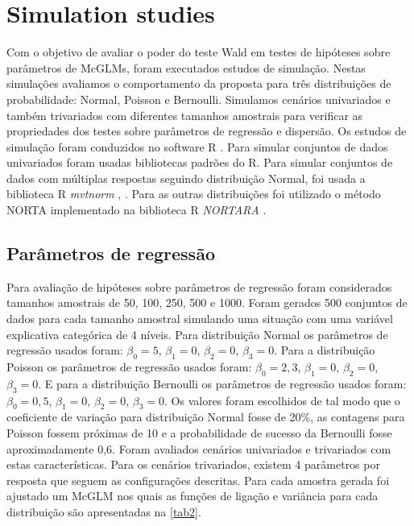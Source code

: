\documentclass[AMA,STIX1COL]{WileyNJD-v2}
\begin{document}

\section{Simulation studies}\label{sec5}

Com o objetivo de avaliar o poder do teste Wald em testes de hipóteses sobre parâmetros de McGLMs, foram executados estudos de simulação. Nestas simulações avaliamos o comportamento da proposta para três distribuições de probabilidade: Normal, Poisson e Bernoulli. Simulamos cenários univariados e também trivariados com diferentes tamanhos amostrais para verificar as propriedades dos testes sobre parâmetros de regressão e dispersão. Os estudos de simulação foram conduzidos no software R \cite{R}. Para simular conjuntos de dados univariados foram usadas bibliotecas padrões do R. Para simular conjuntos de dados com múltiplas respostas seguindo distribuição Normal, foi usada a biblioteca R \emph{mvtnorm} \cite{mvtnorm1}, \cite{mvtnorm2}. Para as outras distribuições foi utilizado o método NORTA \cite{norta} implementado na biblioteca R \emph{NORTARA} \cite{nortara}.

\subsection{Parâmetros de regressão}

Para avaliação de hipóteses sobre parâmetros de regressão foram considerados tamanhos amostrais de 50, 100, 250, 500 e 1000. Foram gerados 500 conjuntos de dados para cada tamanho amostral simulando uma situação com uma variável explicativa categórica de 4 níveis. Para distribuição Normal os parâmetros de regressão usados foram: $\beta_0 = 5$, $\beta_1 = 0$, $\beta_2 = 0$, $\beta_3 = 0$. Para a distribuição Poisson os parâmetros de regressão usados foram: $\beta_0 = 2,3$, $\beta_1 = 0$, $\beta_2 = 0$, $\beta_3 = 0$. E para a distribuição Bernoulli os parâmetros de regressão usados foram: $\beta_0 = 0,5$, $\beta_1 = 0$, $\beta_2 = 0$, $\beta_3 = 0$. Os valores foram escolhidos de tal modo que o coeficiente de variação para distribuição Normal fosse de 20\%, as contagens para Poisson fossem próximas de 10 e a probabilidade de sucesso da Bernoulli fosse aproximadamente 0,6. Foram avaliados cenários univariados e trivariados com estas características. Para os cenários trivariados, existem 4 parâmetros por resposta que seguem as configurações descritas. Para cada amostra gerada foi ajustado um McGLM nos quais as funções de ligação e variância para cada distribuição são apresentadas na \autoref{tab2}. 
\end{document}
